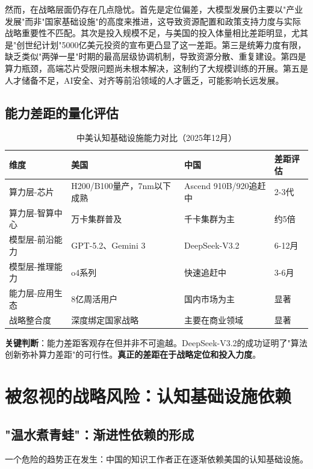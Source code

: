 然而，在战略层面仍存在几点隐忧。首先是定位偏差，大模型发展仍主要以"产业发展"而非"国家基础设施"的高度来推进，这导致资源配置和政策支持力度与实际战略重要性不匹配。其次是投入规模不足，与美国的投入体量相比差距明显，尤其是"创世纪计划"5000亿美元投资的宣布更凸显了这一差距。第三是统筹力度有限，缺乏类似"两弹一星"时期的最高层级协调机制，导致资源分散、重复建设。第四是算力瓶颈，高端芯片受限问题尚未根本解决，这制约了大规模训练的开展。第五是人才储备不足，AI安全、对齐等前沿领域的人才匮乏，可能影响长远发展。

\subsection{能力差距的量化评估}

\begin{table}[H]
\centering
\caption{中美认知基础设施能力对比（2025年12月）}
\small
\begin{tabular}{p{2.8cm}p{3.8cm}p{3.8cm}p{2cm}}
\toprule
\textbf{维度} & \textbf{美国} & \textbf{中国} & \textbf{差距评估} \\
\midrule
算力层-芯片 & H200/B100量产，7nm以下成熟 & Ascend 910B/920追赶中 & 2-3代 \\
算力层-智算中心 & 万卡集群普及 & 千卡集群为主 & 约5倍 \\
模型层-前沿能力 & GPT-5.2、Gemini 3 & DeepSeek-V3.2 & 6-12月 \\
模型层-推理能力 & o4系列 & 快速追赶中 & 3-6月 \\
能力层-应用生态 & 8亿周活用户 & 国内市场为主 & 显著 \\
战略整合度 & 深度绑定国家战略 & 主要在商业领域 & 显著 \\
\bottomrule
\end{tabular}
\end{table}

\textbf{关键判断}：能力差距客观存在但并非不可逾越。DeepSeek-V3.2的成功证明了"算法创新弥补算力差距"的可行性。\textbf{真正的差距在于战略定位和投入力度}。

\section{被忽视的战略风险：认知基础设施依赖}

\subsection{"温水煮青蛙"：渐进性依赖的形成}

一个危险的趋势正在发生：中国的知识工作者正在逐渐依赖美国的认知基础设施。

